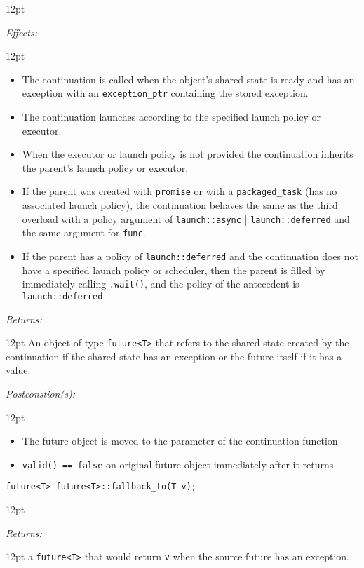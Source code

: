 \documentclass[a4paper,10pt]{article}
\newcommand{\cpp}[1]{\lstinline{#1}}
\newcommand{\wordingItem}[1]{\noindent\textit{#1:}}
\newenvironment{wordingPara}{\begin{adjustwidth}{12pt}{}}{\end{adjustwidth}}
\newenvironment{Effects}{\wordingItem{Effects}\vspace{7pt}\noindent\begin{adjustwidth}{12pt}{}}{\vspace{7pt}\end{adjustwidth}}
\newenvironment{Returns}{\wordingItem{Returns}\vspace{7pt}\noindent\begin{adjustwidth}{12pt}{}}{\vspace{7pt}\end{adjustwidth}}
\newenvironment{Postconditions}{\wordingItem{Postconstion(s)}\vspace{7pt}\noindent\begin{adjustwidth}{12pt}{}}{\vspace{7pt}\end{adjustwidth}}
\begin{document}
\begin{wordingPara}

\begin{Effects}
\begin{itemize}
\item The continuation is called when the object's shared state is ready and has an exception with an \cpp{exception_ptr} containing the stored exception. 
\item The continuation launches according to the specified launch policy or executor. 
\item When the executor or launch policy is not provided the continuation inherits the parent's 
launch policy or executor. 
\item If the parent was created with \cpp{promise} or with a \cpp{packaged_task} (has no associated launch 
policy), the continuation behaves the same as the third overload with a policy argument of 
\cpp{launch::async} | \cpp{launch::deferred} and the same argument for \cpp{func}. 
\item If the parent has a policy of \cpp{launch::deferred} and the continuation does not have a specified 
launch policy or scheduler, then the parent is filled by immediately calling \cpp{.wait()}, and the 
policy of the antecedent is \cpp{launch::deferred}
\end{itemize}
\end{Effects}
 
\begin{Returns}
An object of type \cpp{future<T>} that refers to the shared state created by 
the continuation if the shared state has an exception or the future itself if it has a value. 
\end{Returns}

\begin{Postconditions}
\begin{itemize}
\item The future object is moved to the parameter of the continuation function 
\item \cpp{valid() == false} on original future object immediately after it returns
\end{itemize}
\end{Postconditions}

\end{wordingPara}
\begin{lstlisting}[xleftmargin=0pt]
future<T> future<T>::fallback_to(T v);
\end{lstlisting}
\begin{wordingPara}

\begin{Returns}
a \cpp{future<T>} that would return \cpp{v} when the source future has an exception.
\end{Returns}

\end{wordingPara}
\end{document}

